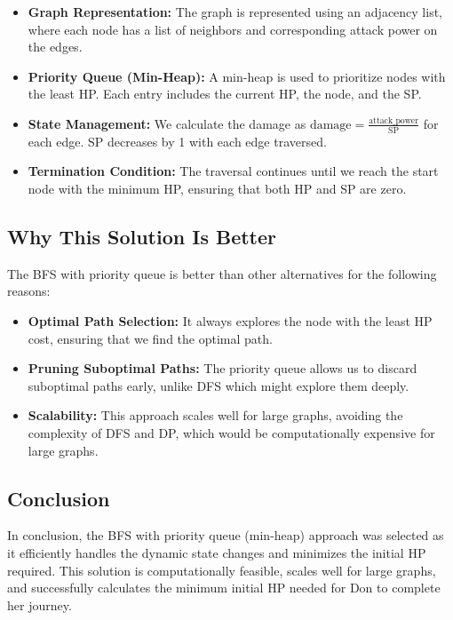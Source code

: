 \documentclass{article}
\begin{document}
\begin{itemize}
    \item \textbf{Graph Representation:} The graph is represented using an adjacency list, where each node has a list of neighbors and corresponding attack power on the edges.
    
    \item \textbf{Priority Queue (Min-Heap):} A min-heap is used to prioritize nodes with the least HP. Each entry includes the current HP, the node, and the SP.
    
    \item \textbf{State Management:} We calculate the damage as \( \text{damage} = \frac{\text{attack\_power}}{\text{SP}} \) for each edge. SP decreases by 1 with each edge traversed.
    
    \item \textbf{Termination Condition:} The traversal continues until we reach the start node with the minimum HP, ensuring that both HP and SP are zero.
\end{itemize}

\subsection{Why This Solution Is Better}
The BFS with priority queue is better than other alternatives for the following reasons:

\begin{itemize}
    \item \textbf{Optimal Path Selection:} It always explores the node with the least HP cost, ensuring that we find the optimal path.
    
    \item \textbf{Pruning Suboptimal Paths:} The priority queue allows us to discard suboptimal paths early, unlike DFS which might explore them deeply.
    
    \item \textbf{Scalability:} This approach scales well for large graphs, avoiding the complexity of DFS and DP, which would be computationally expensive for large graphs.
\end{itemize}

\subsection{Conclusion}
In conclusion, the BFS with priority queue (min-heap) approach was selected as it efficiently handles the dynamic state changes and minimizes the initial HP required. This solution is computationally feasible, scales well for large graphs, and successfully calculates the minimum initial HP needed for Don to complete her journey.
\end{document}
